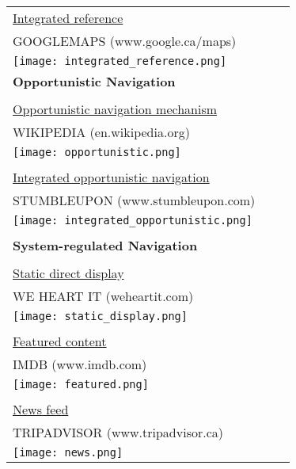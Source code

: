 \begin{longtable}{|p{0.90\linewidth}|}
\\
\underline{Integrated reference}			\\
GOOGLEMAPS (www.google.ca/maps)\\
\texttt{[image: integrated\_reference.png]}\\
\hline

\pagebreak
\hline

\textbf{Opportunistic Navigation}          \\
\\
\underline{Opportunistic navigation mechanism}        \\
WIKIPEDIA (en.wikipedia.org)\\
\texttt{[image: opportunistic.png]}\\
\\
\underline{Integrated opportunistic navigation} \\ 
STUMBLEUPON (www.stumbleupon.com)\\
\texttt{[image: integrated\_opportunistic.png]}\\
\\
\hline        
\textbf{System-regulated Navigation}            \\	
\\	
\underline{Static direct display}           \\
WE HEART IT (weheartit.com)\\
\texttt{[image: static\_display.png]}\\
\\
\hline
\pagebreak
\hline
\underline{Featured content}             	\\
IMDB (www.imdb.com)\\
\texttt{[image: featured.png]}\\
\\
\underline{News feed}      			\\
TRIPADVISOR (www.tripadvisor.ca)\\
\texttt{[image: news.png]}\\
\hline

\end{longtable}
\clearpage

